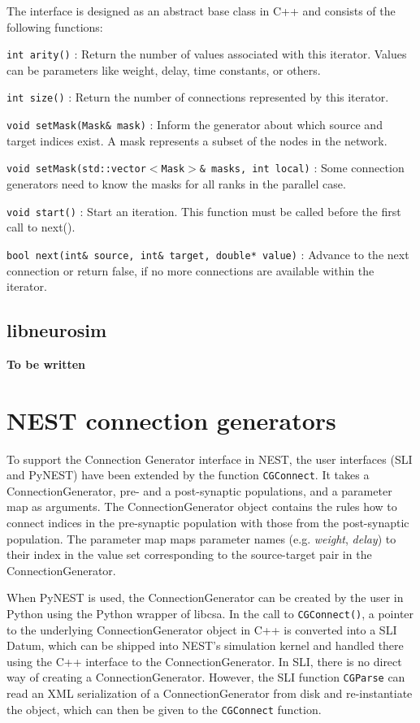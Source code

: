 \documentclass{frontiersSCNS} %
\newcommand{\tbw}[1]{{\bf\parindent0pt\color{red}#1}}
\begin{document}
The interface is designed as an abstract base class in C++ and
consists of the following functions:

\begin{unlist}
\item[\tt int arity()]: Return the number of values associated with this
  iterator. Values can be parameters like weight, delay, time
  constants, or others.
\item[\tt int size()]: Return the number of connections represented by
  this iterator.
\item[\tt void setMask(Mask\& mask)]: Inform the generator about which
  source and target indices exist. A mask represents a subset of the
  nodes in the network.
\item[\tt void setMask(std::vector$<$Mask$>$\& masks, int local)]: Some
  connection generators need to know the masks for all ranks in the
  parallel case.
\item[\tt void start()]: Start an iteration. This function must be called
  before the first call to next().
\item[\tt bool next(int\& source, int\& target, double* value)]: Advance
  to the next connection or return false, if no more connections are
  available within the iterator.
\end{unlist}

\subsection{libneurosim}
\tbw{To be written}

\section{NEST connection generators}\label{sec:conn_gen_nest}

To support the Connection Generator interface in NEST, the user
interfaces (SLI and PyNEST) have been extended by the function
\texttt{CGConnect}. It takes a ConnectionGenerator, pre- and a
post-synaptic populations, and a parameter map as arguments. The
ConnectionGenerator object contains the rules how to connect indices
in the pre-synaptic population with those from the post-synaptic
population. The parameter map maps parameter names (e.g.
\emph{weight}, \emph{delay}) to their index in the value set
corresponding to the source-target pair in the ConnectionGenerator.

When PyNEST is used, the ConnectionGenerator can be created by the
user in Python using the Python wrapper of libcsa. In the call to
\texttt{CGConnect()}, a pointer to the underlying ConnectionGenerator
object in C++ is converted into a SLI Datum, which can be shipped into
NEST's simulation kernel and handled there using the C++ interface to
the ConnectionGenerator. In SLI, there is no direct way of creating a
ConnectionGenerator. However, the SLI function \texttt{CGParse} can
read an XML serialization of a ConnectionGenerator from disk and
re-instantiate the object, which can then be given to the
\texttt{CGConnect} function.
\end{document}

